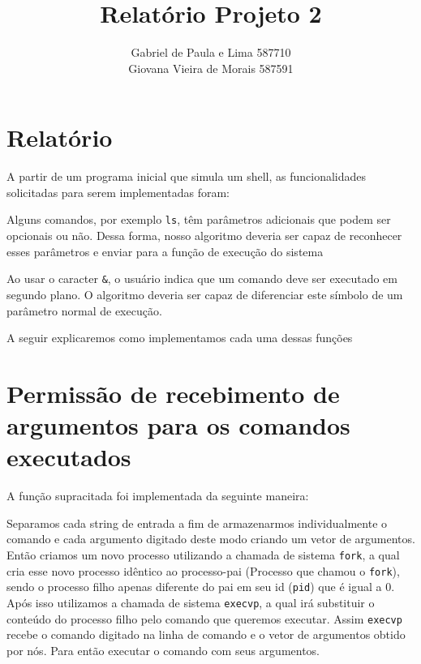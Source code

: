 \documentclass[12pt]{article}
\author{Gabriel de Paula e Lima  587710\\
        Giovana Vieira de Morais  587591}
\title{Relatório Projeto 2}
\begin{document}
\maketitle

\newpage

\section*{Relatório}

A partir de um programa inicial que simula um shell, as funcionalidades solicitadas para serem implementadas foram:

\begin{description}[labelindent=1cm]
    \item[Permissão de argumentos para os comandos
        executados]{Alguns comandos, por exemplo \texttt{ls}, têm parâmetros
        adicionais que podem ser opcionais ou não. Dessa forma, nosso algoritmo
        deveria ser capaz de reconhecer esses parâmetros e enviar para a função
        de execução do sistema}
    \item[Suporte para execução de comandos em segundo plano]{Ao usar o
        caracter \texttt{\&}, o usuário indica que um comando deve ser executado
        em segundo plano. O algoritmo deveria ser capaz de diferenciar este
        símbolo de um parâmetro normal de execução.}
    \item[Redirecionamento de entrada e saída padrão para arquivos]
\end{description}

A seguir explicaremos como implementamos cada uma dessas funções

\section*{Permissão de recebimento de argumentos para os comandos executados}
 A função supracitada foi implementada da seguinte maneira:

 Separamos cada string de entrada a fim de armazenarmos individualmente o comando e cada argumento digitado
 deste modo criando um vetor de argumentos.
 Então criamos um novo processo utilizando a chamada de sistema \texttt{fork},
 a qual cria esse novo processo idêntico ao processo-pai (Processo que chamou o \texttt{fork}),
 sendo o processo filho apenas diferente do pai em seu id (\texttt{pid}) que é igual a 0.
 Após isso utilizamos a chamada de sistema \texttt{execvp},
 a qual irá substituir o conteúdo do processo filho pelo comando que queremos executar.
 Assim \texttt{execvp} recebe o comando digitado na linha de comando e o vetor de argumentos obtido por nós.
 Para então executar o comando com seus argumentos.
\end{document}
